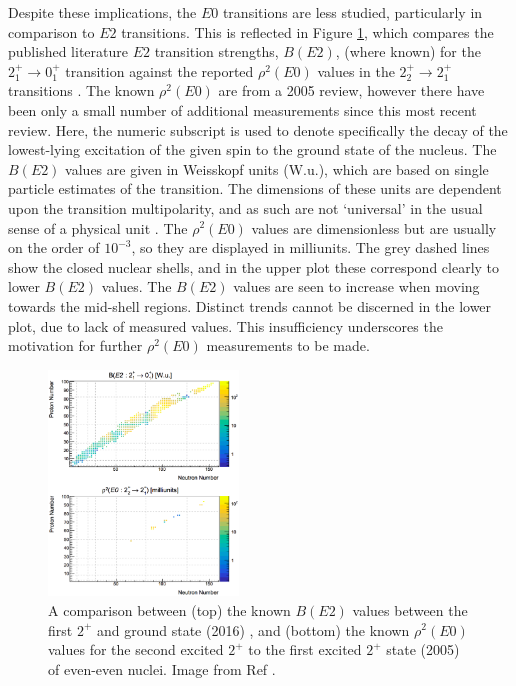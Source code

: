 \documentclass[twocolumn,preprintnumbers,amsmath,amssymb]{revtex4}
\begin{document}
Despite these implications, the $E0$ transitions are less studied, particularly in comparison to $E2$ transitions. This is reflected in Figure \ref{comparison}, which compares the published literature $E2$ transition strengths, $B(E2)$, (where known) for the $2^+_1 \rightarrow 0^+_1$ transition \cite{evitts_17} against the reported $\rho^2(E0)$ values in the $2^+_2 \rightarrow 2^+_1$ transitions \cite{evitts_5}.  The known $\rho^2(E0)$ are from a 2005 review, however there have been only a small number of additional measurements since this most recent review. Here, the numeric subscript is used to denote specifically the decay of the lowest-lying excitation of the given spin to the ground state of the nucleus. The $B(E2)$ values are given in Weisskopf units (W.u.), which are based on single particle estimates of the transition. The dimensions of these units are dependent upon the transition multipolarity, and as such are not `universal' in the usual sense of a physical unit \cite{evitts_4}. The $\rho^2(E0)$ values are dimensionless but are usually on the order of $10^{-3}$, so they are displayed in milliunits. The grey dashed lines show the closed nuclear shells, and in the upper plot these correspond clearly to lower $B(E2)$ values. The $B(E2)$ values are seen to increase when moving towards the mid-shell regions. Distinct trends cannot be discerned in the lower plot, due to lack of measured values. This insufficiency underscores the motivation for further $\rho^2(E0)$ measurements to be made.
\begin{figure}[!hht]
  \centering
  \includegraphics[width=0.45\textwidth, height=0.6\textwidth,keepaspectratio]{EvittsE2E0.png}
  \caption{A comparison between (top) the known $B(E2)$ values between the first $2^+$ and ground state (2016) \cite{evitts_17}, and (bottom) the known $\rho^2(E0)$ values for the second excited $2^+$ to the first excited $2^+$ state (2005) \cite{evitts_5} of even-even nuclei. Image from Ref \cite{EVITTS}.}
  \label{comparison}
\end{figure}
\end{document}
